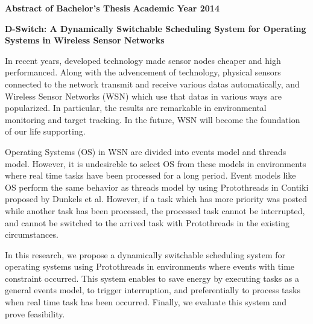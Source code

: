 \newpage

\begin{center}
\textbf{\Large Abstract of Bachelor's Thesis}
\textbf{\Large Academic Year 2014}
\vspace{6.18mm}

\textbf{\Large D-Switch: A Dynamically Switchable Scheduling System for Operating Systems in Wireless Sensor Networks}
\end{center}

\vspace{10mm}

In recent years, 
developed technology made 
sensor nodes cheaper and high performanced.
Along with the advencement of technology,
physical sensors connected to the network
transmit and receive various datas automatically,
and Wireless Sensor Networks (WSN) which use that datas in various ways are popularized.
In particular, the results are remarkable
in environmental monitoring and target tracking.
In the future, WSN will become the foundation of our life supporting. 

Operating Systems (OS) in WSN
are divided into events model and threads model.
However, it is undesireble to 
select OS from these models  
in environments where 
real time tasks have been processed 
for a long period.
Event models like OS perform the same behavior as 
threads model
by using Protothreads\cite{Dunkels:2006:PSE:1182807.1182811} 
in Contiki\cite{Dunkels:2004:CLF:1032658.1034117}
proposed by Dunkels et al.
However, 
if a task which has more priority was posted 
while another task has been processed,
the processed task cannot be interrupted,
and cannot be switched to the arrived task 
with Protothreads
in the existing circumstances.

In this research, we propose 
a dynamically switchable scheduling system for operating systems 
using Protothreads
in environments where events with time constraint occurred.
This system enables to save energy by executing tasks 
as a general events model,
to trigger interruption, and 
preferentially to process tasks 
when real time task has been occurred.
Finally, we evaluate this system and prove feasibility.


